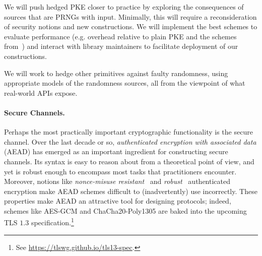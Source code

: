 \begin{task}
We will push hedged PKE closer to practice by exploring the
consequences of sources that are PRNGs with input.  Minimally, this will require
a reconsideration of security notions and new constructions.  We will
implement the best schemes to evaluate performance (e.g. overhead
relative to plain PKE and the schemes from~\cite{BPS}) and interact
with library maintainers to facilitate deployment of our constructions.
\end{task}

\begin{task}
We will work to hedge other primitives against faulty randomness,
using appropriate models of the randomness sources, all from the
viewpoint of what real-world APIs expose.
\end{task}


\paragraph{Secure Channels. }
\fi
Perhaps the most practically important cryptographic functionality is the
secure channel.
%
%
Over the last decade or so, \emph{authenticated encryption with associated data}
(AEAD) has emerged as an important ingredient for constructing secure channels.
%
Its syntax is easy to reason about from a theoretical point of view, and yet is
robust enough to encompass most tasks that practitioners encounter. Moreover,
notions like \emph{nonce-misuse resistant}~\cite{RS06} and
\emph{robust}~\cite{HKR15} authenticated encryption make AEAD schemes difficult
to (inadvertently) use incorrectly. These properties make AEAD an attractive
tool for designing protocols; indeed, schemes like AES-GCM and
ChaCha20\mbox{-}Poly1305 are baked into the upcoming TLS $1.3$
specification.\footnote{ See \url{https://tlswg.github.io/tls13-spec}.}

